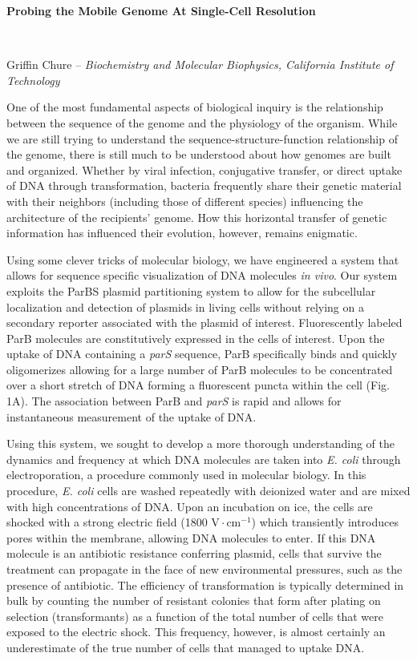 \documentclass[letterpaper, 12pt]{article}
\begin{document}
\centerline{\textbf{Probing the Mobile Genome At Single-Cell Resolution}}\\
\centerline{\footnotesize Griffin Chure -- \textit{Biochemistry and Molecular Biophysics, California
Institute of Technology}}
\vspace*{0.8em}
One of the most fundamental aspects of biological inquiry is the relationship
between the sequence of the genome and the physiology of the organism. While we
are still trying to understand the sequence-structure-function relationship of
the genome, there is still much to be understood about how genomes are built and
organized. Whether by viral infection, conjugative transfer, or direct uptake of DNA
through transformation, bacteria frequently share their genetic material with
their neighbors (including those of different species) influencing the
architecture of the recipients' genome. How this horizontal transfer
of genetic information has influenced their evolution, however, remains
enigmatic. 

Using some clever tricks of molecular biology, we have engineered a system that
allows for sequence specific visualization of DNA molecules \textit{in vivo}.
Our system exploits the ParBS plasmid partitioning system to allow for the
subcellular localization and detection of plasmids in living cells without
relying on a secondary reporter associated with the plasmid of interest.   
Fluorescently labeled ParB molecules are constitutively expressed in the
cells of interest. Upon the uptake of DNA containing a \textit{parS} sequence,
ParB specifically binds and quickly oligomerizes allowing for a large number of
ParB molecules to be concentrated over a short stretch of DNA forming a
fluorescent puncta within the cell (Fig. 1A). The association between ParB and
\textit{parS} is rapid  and allows for instantaneous measurement of the uptake
of DNA.

Using this system, we sought to develop a more thorough understanding of the dynamics
and frequency at which DNA molecules are taken into \textit{E. coli} through
electroporation, a procedure commonly used in molecular biology. In this
procedure, \textit{E. coli} cells are washed repeatedly with deionized water and
are mixed with high concentrations of DNA. Upon an incubation on ice, the cells
are shocked with a strong electric field (1800
$\mathrm{V}\cdot\mathrm{cm}^{-1}$) which transiently introduces pores within the
membrane, allowing DNA molecules to enter. If this DNA molecule is an antibiotic
resistance conferring plasmid, cells that survive the treatment can propagate in
the face of new environmental pressures, such as the presence of antibiotic. The
efficiency of transformation is typically determined in bulk by counting the
number of resistant colonies that form after plating on selection
(transformants) as a function of the total number of cells that were exposed to
the electric shock. This frequency, however, is almost certainly an
underestimate of the true number of cells that managed to uptake DNA.
\end{document}
